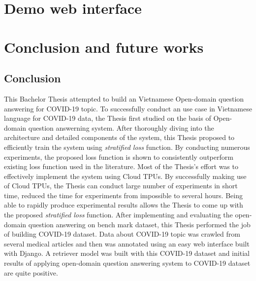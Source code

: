 \documentclass[12pt, sort&compress]{report}
\begin{document}
\chapter{Demo web interface}
\label{chap:05}
\chapter{Conclusion and future works}
\label{chap:06}
\section{Conclusion}
This Bachelor Thesis attempted to build an Vietnamese Open-domain question answering for COVID-19 topic. To successfully conduct an use case in Vietnamese language for COVID-19 data, the Thesis first studied on the basis of Open-domain question answerning system. After thoroughly diving into the architecture and detailed components of the system, this Thesis proposed to efficiently train the system using \textit{stratified loss} function. By conducting numerous experiments, the proposed loss function is shown to consistently outperform existing loss function used in the literature. Most of the Thesis's effort was to effectively implement the system using Cloud TPUs. By successfully making use of Cloud TPUs, the Thesis can conduct large number of experiments in short time, reduced the time for experiments from impossible to several hours. Being able to rapidly produce experimental results allows the Thesis to come up with the proposed \textit{stratified loss} function. After implementing and evaluating the open-domain question answering on bench mark dataset, this Thesis performed the job of building COVID-19 dataset. Data about COVID-19 topic was crawled from several medical articles and then was annotated using an easy web interface built with Django. A retriever model was built with this COVID-19 dataset and initial results of applying open-domain question answering system to COVID-19 dataset are quite positive.
\end{document}
